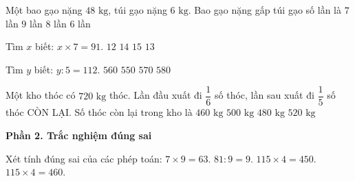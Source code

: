 \begin{ex} %
Một bao gạo nặng $48\text{ kg}$, túi gạo nặng $6\text{ kg}$. Bao gạo nặng gấp túi gạo số lần là
\choice
{$7$ lần}
{$9$ lần}
{\True $8$ lần}
{$6$ lần}
\end{ex}

\begin{ex} %
Tìm $x$ biết: $x \times 7 = 91$.
\choice
{$12$}
{$14$}
{$15$}
{\True $13$}
\end{ex}

\begin{ex} %
Tìm $y$ biết: $y : 5 = 112$.
\choice
{\True $560$}
{$550$}
{$570$}
{$580$}
\end{ex}

\begin{ex} %
Một kho thóc có $720\text{ kg}$ thóc. Lần đầu xuất đi $\dfrac{1}{6}$ số thóc, lần sau xuất đi $\dfrac{1}{5}$ số thóc CÒN LẠI. Số thóc còn lại trong kho là
\choice
{$460\text{ kg}$}
{$500\text{ kg}$}
{\True $480\text{ kg}$}
{$520\text{ kg}$}
\end{ex}

\textbf{Phần 2. Trắc nghiệm đúng sai}

\begin{ex} %
Xét tính đúng sai của các phép toán:
\choiceTF
{\True $7 \times 9 = 63$.}
{\True $81 : 9 = 9$.}
{$115 \times 4 = 450$.}
{\True $115 \times 4 = 460$.}
\end{ex}

